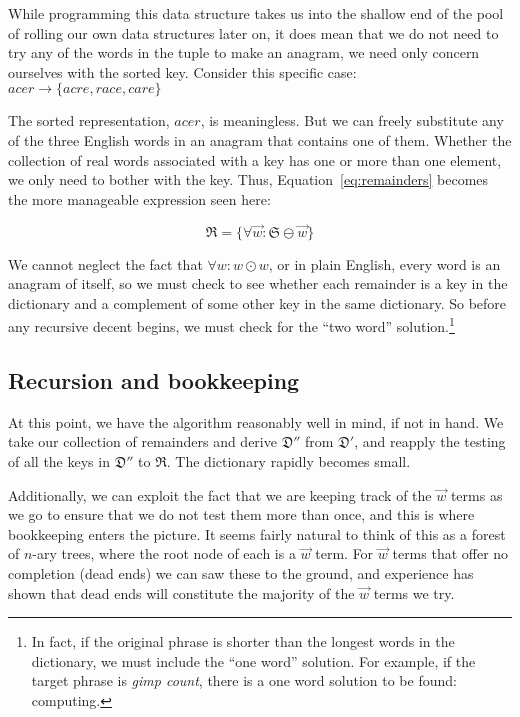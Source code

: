 \documentclass[letterpaper, 11pt]{article}
\newcommand{\Dp}{$\mathfrak{D}'$\xspace}
\newcommand{\Dpp}{$\mathfrak{D}''$\xspace}
\newcommand{\aw}{$\overrightarrow{w}$\xspace}
\begin{document}
While programming this data structure takes us into the shallow end
of the pool of rolling our own data structures later on, it does
mean that we do not need to try any of the words in the tuple to
make an anagram, we need only concern ourselves with the sorted
key. Consider this specific case: $acer \longrightarrow \{acre,
race, care\}$

The sorted representation, $acer$, is meaningless. But we can freely
substitute any of the three English words in an anagram that contains
one of them. Whether the collection of real words associated with
a key has one or more than one element, we only need to bother with the key.
Thus, Equation~\ref{eq:remainders} becomes the more manageable
expression seen here:

\begin{equation}
\mathfrak{R} = \{\forall \overrightarrow{w} : \mathfrak{S} \ominus \overrightarrow{w} \}
\end{equation}

We cannot neglect the fact that $\forall w: w \odot w$, or in plain English,
every word is an anagram of itself, so we must check to see whether each
remainder is a key in the dictionary and a complement of some other
key in the same dictionary. So before any recursive decent begins, we 
must check for the ``two word'' solution.\footnote{In fact, if the 
original phrase is shorter than the longest words in the dictionary,
we must include the ``one word'' solution. For example, if the target
phrase is \emph{gimp count}, there is a one word solution to be found: computing.}

\subsection{Recursion and bookkeeping}

At this point, we have the algorithm reasonably well in mind, if not
in hand. We take our collection of remainders and derive \Dpp from \Dp,
and reapply the testing of all the keys in \Dpp to $\mathfrak{R}$.
The dictionary rapidly becomes small. 

Additionally, we can exploit the fact that we are keeping track of
the \aw terms as we go to ensure that we do not test them more than
once, and this is where bookkeeping enters the picture. It seems
fairly natural to think of this as a forest of $n$-ary trees, where
the root node of each is a \aw term. For \aw terms that offer no
completion (\ie dead ends) we can saw these to the ground, and
experience has shown that dead ends will constitute the majority
of the \aw terms we try.
\end{document}
